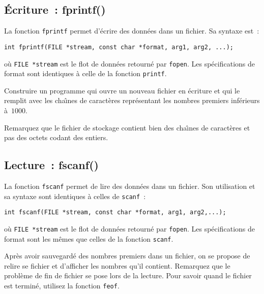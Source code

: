 \subsection{\'Ecriture~: fprintf()}
\label{sec:Ecriture}
La  fonction \texttt{fprintf} permet d'\'ecrire  des donn\'ees dans un
fichier. Sa syntaxe est~:
\begin{verbatim}
int fprintf(FILE *stream, const char *format, arg1, arg2, ...);
\end{verbatim}
o\`u \texttt{FILE *stream} est   le flot de donn\'ees  retourn\'e  par
\texttt{fopen}.  Les sp\'ecifications  de  format sont identiques  \`a
celle de la fonction \texttt{printf}.
\begin{exercice}
  Construire un  programme qui ouvre  un nouveau fichier en \'ecriture
  et  qui le   remplit     avec les  cha\^\i{}nes   de    caract\`eres
  repr\'esentant les nombres premiers inf\'erieurs \`a~$1000$.
  \ifcorrection
  \begin{correction}
    
  \end{correction}
  \fi
  Remarquez que le fichier  de stockage contient bien des cha\^\i{}nes
  de caract\`eres et pas des octets codant des entiers.
\end{exercice}
\subsection{Lecture~: fscanf()}
\label{sec:Lecture}
La  fonction \texttt{fscanf}  permet  de  lire des  donn\'ees  dans un
fichier.  Son utilisation et sa syntaxe  sont identiques \`a celles de
\texttt{scanf}~:
\begin{verbatim}
int fscanf(FILE *stream, const char *format, arg1, arg2,...);
\end{verbatim}
o\`u   \texttt{FILE *stream} est le   flot de donn\'ees retourn\'e par
\texttt{fopen}.  Les sp\'ecifications de format  sont  les m\^emes que
celles de la fonction \texttt{scanf}.
\begin{exercice}
  Apr\`es avoir sauvegard\'e des nombres premiers  dans un fichier, on
  se  propose de  relire se  fichier et  d'afficher les  nombres qu'il
  contient. Remarquez que le probl\`eme de fin de fichier se pose lors
  de la lecture. Pour savoir quand le  fichier est termin\'e, utilisez
  la fonction \texttt{feof}.
  \ifcorrection
  \begin{correction}
    
  \end{correction}
  \fi
\end{exercice}

